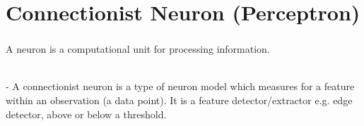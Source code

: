 \section{Connectionist Neuron (Perceptron)}

\begin{frame}\frametitle{\secname}

A neuron is a computational unit for processing information. 

\\

\pause
- A connectionist neuron is a type of neuron model which measures for a feature within an observation (a data point). It is a feature detector/extractor e.g. edge detector, above or below a threshold.

\end{frame}

